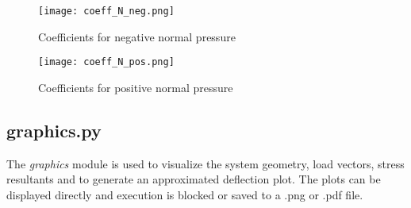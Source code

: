 \begin{figure}[h!]%
    \centering
    \texttt{[image: coeff\_N\_neg.png]}%
    \caption{Coefficients for negative normal pressure}%
    \label{fig:coeff_N_neg}%
\end{figure}

\begin{figure}[h!]%
    \centering
    \texttt{[image: coeff\_N\_pos.png]}%
    \caption{Coefficients for positive normal pressure}%
    \label{fig:coeff_N_pos}%
\end{figure}

\pagebreak

\subsection{graphics.py}
\label{subsec:graphics.py}

The \textit{graphics} module is used to visualize the system geometry, load vectors, stress resultants and to generate an approximated deflection plot.
The plots can be displayed directly and execution is blocked or saved to a .png or .pdf file.

